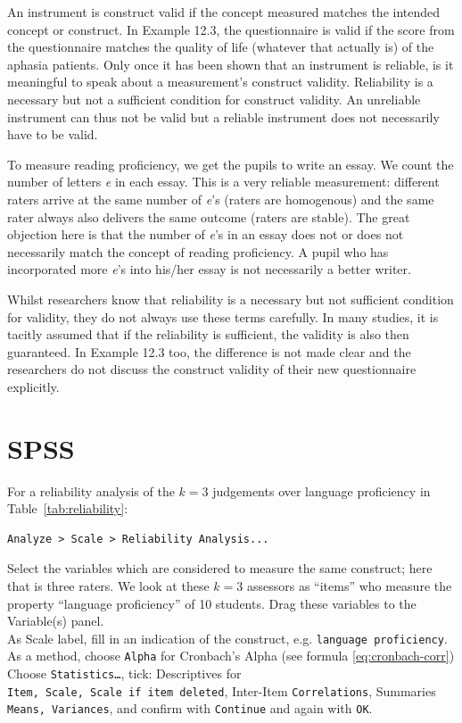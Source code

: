 \documentclass[
]{book}
\begin{document}
An instrument is construct valid if the concept measured matches
the intended concept or construct. In
Example 12.3, the questionnaire is valid if the score from
the questionnaire matches the quality of life (whatever that actually
is) of the aphasia patients. Only once it has been shown that
an instrument is reliable, is it meaningful to speak about a measurement's
construct validity. Reliability is a necessary but not a sufficient condition for
construct validity. An unreliable
instrument can thus not be valid but a reliable instrument does not necessarily
have to be valid.

To measure reading proficiency, we get the pupils to write
an essay. We count the number of letters \emph{e} in each essay. This is
a very reliable measurement: different raters arrive at the same
number of \emph{e}'s (raters are homogenous) and the same rater always also
delivers the same outcome (raters are stable). The great objection here is that
the number of \emph{e}'s in an essay does not or does not necessarily match the concept
of reading proficiency. A pupil who has incorporated more \emph{e}'s into his/her essay
is not necessarily a better writer.

Whilst researchers know that reliability is a necessary but not
sufficient condition for validity, they do not always use these terms
carefully. In many studies, it is tacitly
assumed that if the reliability is sufficient, the validity
is also then guaranteed. In Example 12.3 too, the difference is not
made clear and
the researchers do not discuss the construct validity of their new
questionnaire explicitly.

\hypertarget{spss-9}{%
\section{SPSS}\label{spss-9}}

For a reliability analysis of the \(k=3\) judgements over
language proficiency in
Table~\ref{tab:reliability}:\\

\begin{verbatim}
Analyze > Scale > Reliability Analysis...
\end{verbatim}

Select the variables which are considered to measure the same construct;
here that is three raters. We look at these \(k=3\)
assessors as ``items'' who measure the property ``language proficiency'' of 10
students. Drag these variables to the Variable(s) panel.\\
As Scale label, fill in an indication of the construct, e.g.
\texttt{language\ proficiency}.\\
As a method, choose \texttt{Alpha} for Cronbach's Alpha (see formula
\eqref{eq:cronbach-corr})\\
Choose \texttt{Statistics\ldots{}}, tick: Descriptives for
\texttt{Item,\ Scale,\ Scale\ if\ item\ deleted}, Inter-Item \texttt{Correlations},
Summaries \texttt{Means,\ Variances}, and confirm with \texttt{Continue} and again
with \texttt{OK}.
\end{document}

